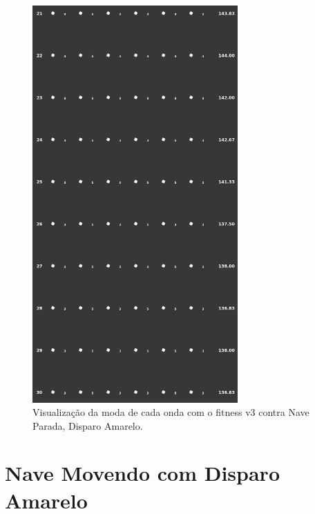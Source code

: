 \begin{figure}[H]
  \centering
  \includegraphics[width=0.7\textwidth]{figuras/ss/ss_yellowstill_ai_mode_2_3.png}
  \caption{Visualização da moda de cada onda com o fitness v3 contra Nave Parada, Disparo Amarelo.}
  \label{fig:ss-moda-ys-2-3}
\end{figure}

\section{Nave Movendo com Disparo Amarelo}
\label{sec:apend-moda-ss-ym-v3}

